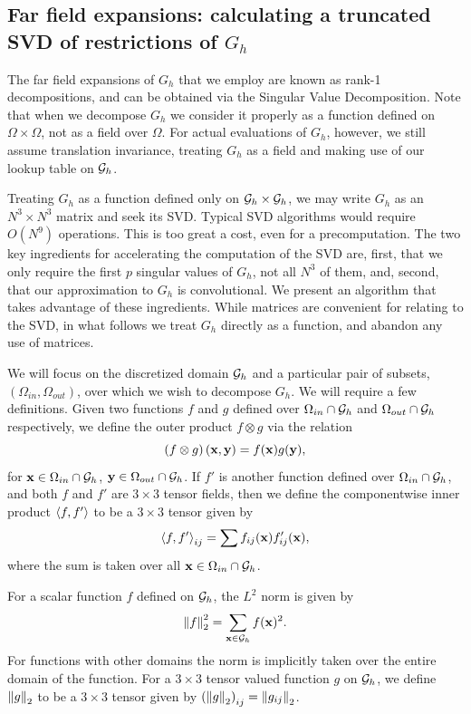 \subsection{Far field expansions: calculating a truncated SVD of restrictions of $G_h$}
\label{sub:Decomposition}
The far field expansions of $G_h$ that we employ are known as rank-1 decompositions, and can be obtained via the Singular Value Decomposition. Note that when we decompose $G_h$ we consider it properly as a function defined on $\Omega \times \Omega$, not as a field over $\Omega$. For actual evaluations of $G_h$, however, we still assume translation invariance, treating $G_h$ as a field and making use of our lookup table on $\mathcal{G}_h$.

Treating $G_h$ as a function defined only on $\mathcal{G}_h\times \mathcal{G}_h$, we may write $G_h$ as an $N^3\times N^3$ matrix and seek its SVD. Typical SVD algorithms would require $O(N^9)$ operations. This is too great a cost, even for a precomputation. The two key ingredients for accelerating the computation of the SVD are, first, that we only require the first $p$ singular values of $G_h$, not all $N^3$ of them, and, second, that our approximation to $G_h$ is convolutional. We present an algorithm that takes advantage of these ingredients. While matrices are convenient for relating to the SVD, in what follows we treat $G_h$ directly as a function, and abandon any use of matrices.

We will focus on the discretized domain $\mathcal{G}_h$ and a particular pair of subsets, $\left(\Omega_{in}, \Omega_{out}\right)$, over which we wish to decompose $G_h$. We will require a few definitions.
Given two functions $f$ and $g$ defined over $\Omega_{in}\cap\mathcal{G}_h$ and $\Omega_{out}\cap\mathcal{G}_h$ respectively, we define the outer product $f\otimes g$ via the relation
\begin{equation}
\left(f\otimes g\right)(\mathbf{x},\mathbf{y}) = f(\mathbf{x})g(\mathbf{y}),
\end{equation}
for $\mathbf{x}\in\Omega_{in}\cap\mathcal{G}_h$, $\mathbf{y}\in\Omega_{out}\cap\mathcal{G}_h$. If $f'$ is another function defined over $\Omega_{in}\cap\mathcal{G}_h$, and both $f$ and $f'$ are $3\times 3$ tensor fields, then we define the componentwise inner product $\left\langle f, f' \right\rangle$ to be a $3\times 3$ tensor given by
\begin{equation}
\left\langle f, f' \right\rangle_{ij} = \sum f_{ij}(\mathbf{x})f'_{ij}(\mathbf{x}), 
\end{equation}
where the sum is taken over all $\mathbf{x}\in\Omega_{in}\cap\mathcal{G}_h$.

For a scalar function $f$ defined on $\mathcal{G}_h$, the $L^2$ norm is given by
\begin{equation}
\left\lVert f\right\rVert_2^2 = \sum_{\mathbf{x}\in\mathcal{G}_h} f(\mathbf{x})^2.
\end{equation}
For functions with other domains the norm is implicitly taken over the entire domain of the function.
For a $3\times 3$ tensor valued function $g$ on $\mathcal{G}_h$, we define $\left\lVert g\right\rVert_2$ to be a $3\times 3$ tensor given by $\left(\left\lVert g\right\rVert_2\right)_{ij} = \left\lVert g_{ij}\right\rVert_2$. 

